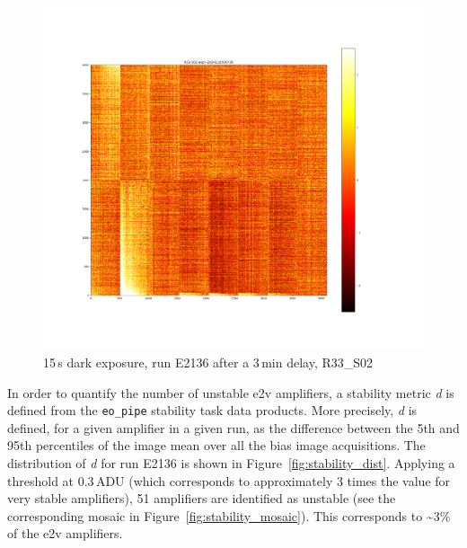 \begin{figure}[htbp]
\vspace{0.5cm}

\begin{minipage}{0.45\textwidth}
    \centering
    \includegraphics[width=\textwidth]{figures/E2136_dark15_delay_R33_S02.png}
    \caption{15\,s dark exposure, run E2136 after a 3\,min delay, R33\_S02}
    \label{fig:r33_s02_2136_delay}
\end{minipage}
\hfill
\begin{minipage}{0.45\textwidth}
    \centering
\end{minipage}
\end{figure}

In order to quantify the number of unstable e2v amplifiers, a stability
metric \emph{d} is defined from the {\tt eo\_pipe}
stability task data products. More precisely, \emph{d} is defined, for a
given amplifier in a given run, as the difference between the 5th and
95th percentiles of the image mean over all the bias image acquisitions. The
distribution of \emph{d} for run E2136 is shown in Figure~\ref{fig:stability_dist}. Applying a
threshold at 0.3\,ADU (which corresponds to approximately 3 times the value for very stable amplifiers), 51 amplifiers are identified as unstable (see the
corresponding mosaic in Figure~\ref{fig:stability_mosaic}). This corresponds to \sim3\% of the e2v
amplifiers.

